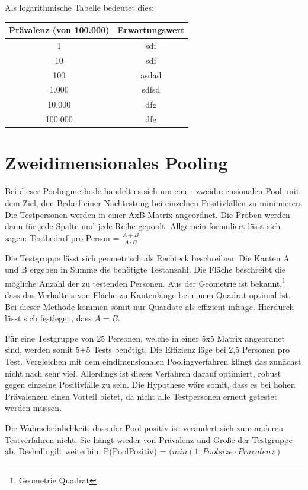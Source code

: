 Als logarithmische Tabelle bedeutet dies:

\begin{tabular}{|c|c|}
	\hline
	Prävalenz (von 100.000) & Erwartungswert \\
	\hline
	1 & sdf \\
	\hline
	10 & sdf \\
	\hline
	100 & asdad \\
	\hline
	1.000 & sdfsd \\
	\hline
	10.000 & dfg \\
	\hline
	100.000 & dfg \\
	\hline
\end{tabular}

\cleardoublepage

\section{Zweidimensionales Pooling}
Bei dieser Poolingmethode handelt es sich um einen zweidimensionalen Pool, mit dem Ziel, den Bedarf einer Nachtestung bei einzelnen Positivfällen zu minimieren.
Die Testpersonen werden in einer AxB-Matrix angeordnet.
Die Proben werden dann für jede Spalte und jede Reihe gepoolt.
Allgemein formuliert lässt sich sagen:
Testbedarf pro Person =
$\frac{A+B}{A\cdot B}$

Die Testgruppe lässt sich geometrisch als Rechteck beschreiben.
Die Kanten A und B ergeben in Summe die benötigte Testanzahl.
Die Fläche beschreibt die mögliche Anzahl der zu testenden Personen.
Aus der Geometrie ist bekannt,\footnote{Geometrie Quadrat}
dass das Verhältnis von Fläche zu Kantenlänge bei einem Quadrat optimal ist.
Bei dieser Methode kommen somit nur Quardate als effizient infrage.
Hierdurch lässt sich festlegen, dass $A=B$.

Für eine Testgruppe von 25 Personen, welche in einer 5x5 Matrix angeordnet sind, werden somit 5+5 Tests benötigt.
Die Effizienz läge bei 2,5 Personen pro Test.
Vergleichen mit dem eindimensionalen Poolingverfahren klingt das zunächst nicht nach sehr viel.
Allerdings ist dieses Verfahren darauf optimiert, robust gegen einzelne Positivfälle zu sein.
Die Hypothese wäre somit, dass es bei hohen Prävalenzen einen Vorteil bietet, da nicht alle Testpersonen erneut getestet werden müssen.

Die Wahrscheinlichkeit, dass der Pool positiv ist verändert sich zum anderen Testverfahren nicht.
Sie hängt wieder von Prävalenz und Größe der Testgruppe ab.
Deshalb gilt weiterhin:
P(PoolPositiv) = $(min\left(1;Poolsize\cdot Pravalenz\right)$

